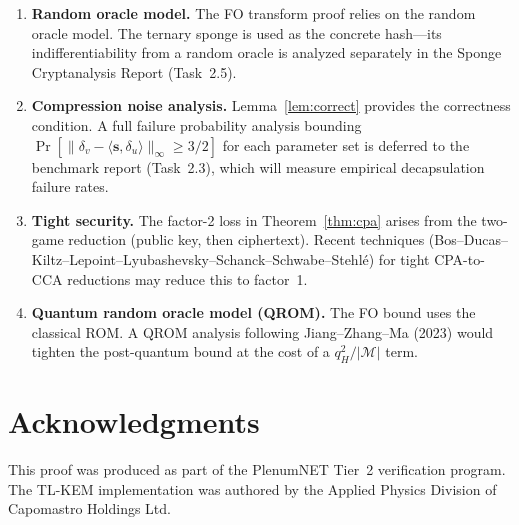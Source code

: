 \documentclass[11pt,a4paper]{article}
\theoremstyle{definition}
\begin{document}
\begin{enumerate}[leftmargin=2em]
  \item \textbf{Random oracle model.} The FO transform proof relies on the random oracle model. The ternary sponge is used as the concrete hash---its indifferentiability from a random oracle is analyzed separately in the Sponge Cryptanalysis Report (Task~2.5).

  \item \textbf{Compression noise analysis.} Lemma~\ref{lem:correct} provides the correctness condition. A full failure probability analysis bounding $\Pr[\|\delta_v - \langle \mathbf{s}, \delta_u \rangle\|_\infty \geq 3/2]$ for each parameter set is deferred to the benchmark report (Task~2.3), which will measure empirical decapsulation failure rates.

  \item \textbf{Tight security.} The factor-2 loss in Theorem~\ref{thm:cpa} arises from the two-game reduction (public key, then ciphertext). Recent techniques (Bos--Ducas--Kiltz--Lepoint--Lyubashevsky--Schanck--Schwabe--Stehl\'e) for tight CPA-to-CCA reductions may reduce this to factor~1.

  \item \textbf{Quantum random oracle model (QROM).} The FO bound uses the classical ROM. A QROM analysis following Jiang--Zhang--Ma (2023) would tighten the post-quantum bound at the cost of a $q_H^2/|\mathcal{M}|$ term.
\end{enumerate}

\section*{Acknowledgments}

This proof was produced as part of the PlenumNET Tier~2 verification program. The TL-KEM implementation was authored by the Applied Physics Division of Capomastro Holdings Ltd.
\end{document}
